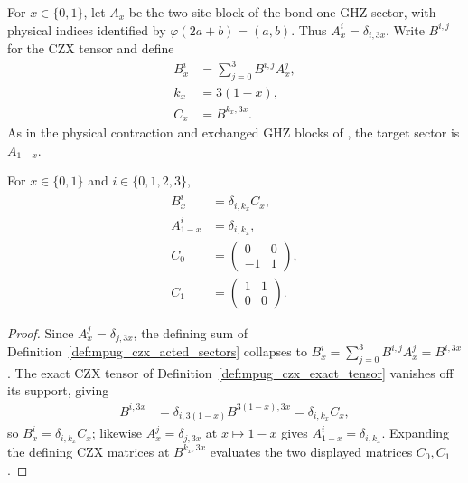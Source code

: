 \begin{definition}
    \label{def:mpug_czx_acted_sectors}
    \leanok
    For $x\in\{0,1\}$, let $A_x$ be the two-site block of the
    bond-one GHZ sector, with physical indices identified by
    $\varphi(2a+b)=(a,b)$. Thus $A_x^i=\delta_{i,3x}$.
    Write $B^{i,j}$ for the CZX tensor and define
    \begin{align}
        B_x^i & =\sum_{j=0}^3 B^{i,j}A_x^j, \\
        k_x   & =3(1-x),                    \\
        C_x   & =B^{k_x,3x}.
        \label{eq:mpug_czx_acted_sectors}
    \end{align}
    As in the physical contraction and exchanged GHZ blocks of
    \cite[lines~4660--4694]{FrancoRubio2025MPUGauging}, the target sector
    is $A_{1-x}$.
\end{definition}

\begin{lemma}
    \label{thm:mpug_czx_acted_sector_coordinates}
    \leanok
    For $x\in\{0,1\}$ and $i\in\{0,1,2,3\}$,
    \begin{align}
        B_x^i     & =\delta_{i,k_x}C_x,                     \\
        A_{1-x}^i & =\delta_{i,k_x},                        \\
        C_0       & =\begin{pmatrix}0&0\\-1&1\end{pmatrix}, \\
        C_1       & =\begin{pmatrix}1&1\\0&0\end{pmatrix}.
        \label{eq:mpug_czx_action_matrices}
    \end{align}
\end{lemma}
\begin{proof}\leanok
    Since $A_x^j=\delta_{j,3x}$, the defining sum of
    Definition~\ref{def:mpug_czx_acted_sectors} collapses to
    $B_x^i=\sum_{j=0}^3 B^{i,j}A_x^j=B^{i,3x}$. The exact CZX tensor of
    Definition~\ref{def:mpug_czx_exact_tensor} vanishes off its support,
    giving
    \begin{align}
        B^{i,3x} & =\delta_{i,3(1-x)}B^{3(1-x),3x}=\delta_{i,k_x}C_x,
    \end{align}
    so $B_x^i=\delta_{i,k_x}C_x$; likewise $A_x^j=\delta_{j,3x}$ at
    $x\mapsto1-x$ gives $A_{1-x}^i=\delta_{i,k_x}$. Expanding the defining
    CZX matrices at $B^{k_x,3x}$ evaluates the two displayed matrices
    $C_0,C_1$.
\end{proof}

